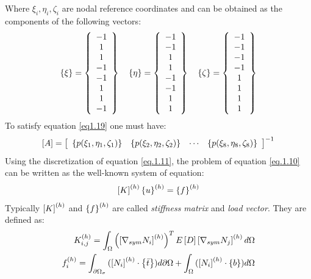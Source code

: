 Where $\xi_i,\eta_i,\zeta_i$ are nodal reference coordinates and can be obtained as the components of the following vectors:
\begin{eqnarray}
	\left\lbrace{\xi}\right \rbrace=\left\lbrace{\begin{array}{c}
		-1\\1\\1\\-1\\-1\\1\\1\\-1
		\end{array}}\right \rbrace \quad \left\lbrace{\eta}\right \rbrace=\left\lbrace{\begin{array}{c}
		-1\\-1\\1\\1\\-1\\-1\\1\\1
		\end{array}}\right \rbrace \quad\left\lbrace{\zeta}\right \rbrace=\left\lbrace{\begin{array}{c}
		-1\\-1\\-1\\-1\\1\\1\\1\\1
		\end{array}}\right \rbrace
\end{eqnarray}
To satisfy equation \eqref{eq1.19} one must have:
\begin{equation}
\left[{A}\right]=\left[{\begin{array}{cccc}
\left\lbrace{p(\xi_1,\eta_1,\zeta_1)}\right \rbrace&\left\lbrace{p(\xi_2,\eta_2,\zeta_2)}\right \rbrace&\cdots&\left\lbrace{p(\xi_8,\eta_8,\zeta_8)}\right \rbrace
\end{array}}\right]^{-1}
\end{equation}
Using the discretization of equation \eqref{eq.1.11}, the problem of equation \eqref{eq.1.10} can be written as the well-known system of equation:
\begin{equation}
\label{eq.1.13}
\left[{K}\right]^{(h)}\left\lbrace{u}\right \rbrace^{(h)}=\left\lbrace{f}\right \rbrace^{(h)}
\end{equation}
Typically $\left[{K}\right]^{(h)}$ and $\left\lbrace{f}\right \rbrace^{(h)}$ are called \textit{stiffness matrix} and \textit{load vector}. They are defined as:
\begin{eqnarray}
\label{eq.1.14}
{K}_{i,j}^{(h)}=\int_{\Omega}{\left(\left[{\nabla_{sym}N_i}\right]^{(h)}\right)^T E\left[{D}\right]\left[{\nabla_{sym}N_j}\right]^{(h)}   d\Omega}\\
\label{eq.1.15}
{f}_{i}^{(h)}=\int_{\partial \Omega_{\sigma}}{(\left[{N_i}\right]^{(h)} \cdot \left\lbrace{\bar{t}}\right \rbrace )d\partial \Omega}+\int_{\Omega}{(\left[{N_i}\right]^{(h)}\cdot \left\lbrace{b}\right \rbrace) d\Omega}
\end{eqnarray}
